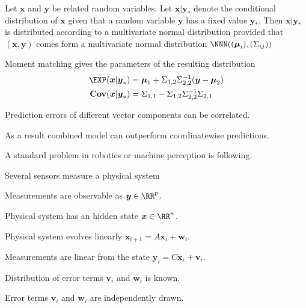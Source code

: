 \documentclass[landscape,footrule]{foils}
\renewcommand{\vec}[1]{\boldsymbol{#1}}
\newcommand{\COV}{\mathbf{Cov}}
\begin{document}

Let $\vec{x}$ and $\vec{y}$ be related random variables. 
Let $\vec{x}|\vec{y}_*$ denote the conditional distribution of $\vec{x}$ given that a random variable $\vec{y}$ has a fixed value $\vec{y}_*$.
Then $\vec{x}|\vec{y}_*$ is distributed according to a multivariate normal distribution provided that 
 $(\vec{x},\vec{y})$ comes form a multivariate normal distribution $\NNN((\vec{\mu}_i),(\Sigma_{ij}))$

\begin{triangles}
\item Moment matching gives the parameters of the resulting distribution 
\begin{align*}
\EXP(\vec{x}|\vec{y}_*)&= \vec{\mu}_1+ \Sigma_{1,2}\Sigma_{2,2}^{-1}(\vec{y}-\vec{\mu}_2)\\
\COV(\vec{x}|\vec{y}_*)&= \Sigma_{1,1}-\Sigma_{1,2}\Sigma_{2,2}^{-1}\Sigma_{2,1}\\
\end{align*}
\end{triangles}





Prediction errors of different vector components can be correlated.
\vspace*{3ex} 


As a result combined model can outperform coordinatewise predictions. \vspace*{-2ex}






A standard problem in robotics or machine perception is following.
\begin{triangles}
\item Several sensors measure a physical system
\item Measurements are observable as $\vec{y}\in\RR^p$.
\item Physical system has an hidden state $\vec{x}\in\RR^n$.
\item Physical system evolves linearly $\vec{x}_{i+1}=A\vec{x}_i+\vec{w}_i$.
\item Measurements are linear from the state $\vec{y}_{i}=C\vec{x}_i+\vec{v}_i$.
\item Distribution of error terms $\vec{v}_i$ and $\vec{w}_i$ is known.  
\item Error terms $\vec{v}_i$ and $\vec{w}_i$ are independently drawn.
\end{triangles}
\end{document}
